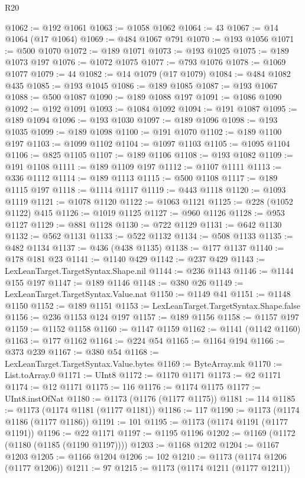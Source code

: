 \begin{lexlean}{R20}
\begin{coremodule}
@1062 := @192 @1061
@1063 := @1058 @1062
@1064 := 43
@1067 := @14 @1064 (@17 @1064)
@1069 := @484 @1067 @791
@1070 := @193 @1056
@1071 := @500 @1070
@1072 := @189 @1071
@1073 := @193 @1025
@1075 := @189 @1073 @197
@1076 := @1072 @1075
@1077 := @793 @1076
@1078 := @1069 @1077
@1079 := 44
@1082 := @14 @1079 (@17 @1079)
@1084 := @484 @1082 @435
@1085 := @193 @1045
@1086 := @189 @1085
@1087 := @193 @1067
@1088 := @500 @1087
@1090 := @189 @1088 @197
@1091 := @1086 @1090
@1092 := @192 @1091
@1093 := @1084 @1092
@1094 := @191 @1087
@1095 := @189 @1094
@1096 := @193 @1030
@1097 := @189 @1096
@1098 := @193 @1035
@1099 := @189 @1098
@1100 := @191 @1070
@1102 := @189 @1100 @197
@1103 := @1099 @1102
@1104 := @1097 @1103
@1105 := @1095 @1104
@1106 := @825 @1105
@1107 := @189 @1106
@1108 := @193 @1082
@1109 := @191 @1108
@1111 := @189 @1109 @197
@1112 := @1107 @1111
@1113 := @336 @1112
@1114 := @189 @1113
@1115 := @500 @1108
@1117 := @189 @1115 @197
@1118 := @1114 @1117
@1119 := @443 @1118
@1120 := @1093 @1119
@1121 := @1078 @1120
@1122 := @1063 @1121
@1125 := @228 (@1052 @1122) @415
@1126 := @1019 @1125
@1127 := @960 @1126
@1128 := @953 @1127
@1129 := @881 @1128
@1130 := @722 @1129
@1131 := @642 @1130
@1132 := @562 @1131
@1133 := @522 @1132
@1134 := @508 @1133
@1135 := @482 @1134
@1137 := @436 (@438 @1135)
@1138 := @177 @1137
@1140 := @178 @181 @23
@1141 := @1140 @429
@1142 := @237 @429
@1143 := LexLeanTarget.TargetSyntax.Shape.nil
@1144 := @236 @1143
@1146 := @1144 @155 @197
@1147 := @189 @1146
@1148 := @380 @26
@1149 := LexLeanTarget.TargetSyntax.Value.nat
@1150 := @1149 @41
@1151 := @1148 @1150
@1152 := @189 @1151
@1153 := LexLeanTarget.TargetSyntax.Shape.false
@1156 := @236 @1153 @124 @197
@1157 := @189 @1156
@1158 := @1157 @197
@1159 := @1152 @1158
@1160 := @1147 @1159
@1162 := @1141 (@1142 @1160)
@1163 := @177 @1162
@1164 := @224 @54
@1165 := @1164 @194
@1166 := @373 @239
@1167 := @380 @54
@1168 := LexLeanTarget.TargetSyntax.Value.bytes
@1169 := ByteArray.mk
@1170 := List.toArray.{0}
@1171 := UInt8
@1172 := @1170 @1171
@1173 := @2 @1171
@1174 := @12 @1171
@1175 := 116
@1176 := @1174 @1175
@1177 := UInt8.instOfNat
@1180 := @1173 (@1176 (@1177 @1175))
@1181 := 114
@1185 := @1173 (@1174 @1181 (@1177 @1181))
@1186 := 117
@1190 := @1173 (@1174 @1186 (@1177 @1186))
@1191 := 101
@1195 := @1173 (@1174 @1191 (@1177 @1191))
@1196 := @22 @1171
@1197 := @1195 @1196
@1202 := @1169 (@1172 (@1180 (@1185 (@1190 @1197))))
@1203 := @1168 @1202
@1204 := @1167 @1203
@1205 := @1166 @1204
@1206 := 102
@1210 := @1173 (@1174 @1206 (@1177 @1206))
@1211 := 97
@1215 := @1173 (@1174 @1211 (@1177 @1211))

\end{coremodule}
\end{lexlean}
